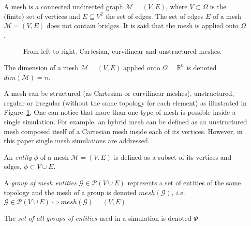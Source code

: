 \begin{mydef}
A mesh is a connected undirected graph $\mathcal{M}=(V,E)$, where $V\subset \Omega$ is the (finite) set of vertices and $E\subseteq V^2$ the set of edges. The set of edges $E$ of a mesh $\mathcal{M}=(V,E)$ does not contain bridges. It is said that the mesh is applied onto $\Omega$.
\end{mydef}
\begin{figure}[!h]\begin{center}
  \caption{From left to right, Cartesian, curvilinear and unstructured meshes.}
  \label{fig:mesh1}
\end{center}\end{figure}
\begin{mydef}
The dimension of a mesh $\mathcal{M}=(V,E)$ applied onto $\Omega=\mathbb{R}^n$ is denoted $dim(\mathcal{M})=n$.
\end{mydef}
A mesh can be structured (as Cartesian or curvilinear meshes), unstructured, regular or irregular (without the same topology for each element) as illustrated in Figure~\ref{fig:mesh1}. One can notice that more than one type of mesh is possible inside a single simulation. For example, an hybrid mesh can be defined as an unstructured mesh composed itself of a Cartesian mesh inside each of its vertices. However, in this paper single mesh simulations are addressed.

\medskip

\begin{mydefs}
\item An \textit{entity} $\phi$ of a mesh $\mathcal{M}=(V,E)$ is defined as a subset of its vertices and edges, $\phi\subset V\cup E$.
\item A \textit{group of mesh entities} $\mathcal{G} \in \mathcal{P}(V\cup E)$ represents a set of entities of the same topology and the mesh of a group is denoted $mesh(\mathcal{G})$, \textit{i.e.} $\mathcal{G} \in \mathcal{P}(V\cup E) \Leftrightarrow mesh(\mathcal{G})=(V,E)$
\item The \textit{set of all groups of entities} used in a simulation is denoted $\Phi$.
\end{mydefs}

